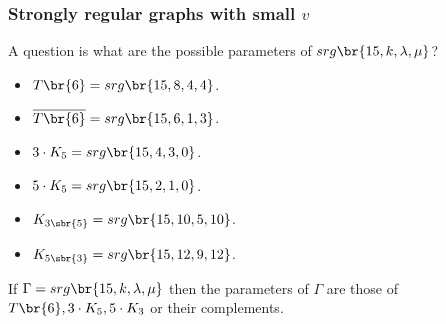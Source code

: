 \pagebreak

\subsubsection{Strongly regular graphs with small \texorpdfstring{$ v $}{v}}

A question is what are the possible parameters of $ srg\br{15, k, \lambda, \mu} $?

\begin{example*}
\hfill
\begin{itemize}
\item $ T\br{6} = srg\br{15, 8, 4, 4} $.
\item $ \overline{T\br{6}} = srg\br{15, 6, 1, 3} $.
\item $ 3 \cdot K_5 = srg\br{15, 4, 3, 0} $.
\item $ 5 \cdot K_5 = srg\br{15, 2, 1, 0} $.
\item $ K_{3\sbr{5}} = srg\br{15, 10, 5, 10} $.
\item $ K_{5\sbr{3}} = srg\br{15, 12, 9, 12} $.
\end{itemize}
\end{example*}

\begin{proposition}
If $ \Gamma = srg\br{15, k, \lambda, \mu} $ then the parameters of $ \Gamma $ are those of $ T\br{6}, 3 \cdot K_5, 5 \cdot K_3 $ or their complements.
\end{proposition}

